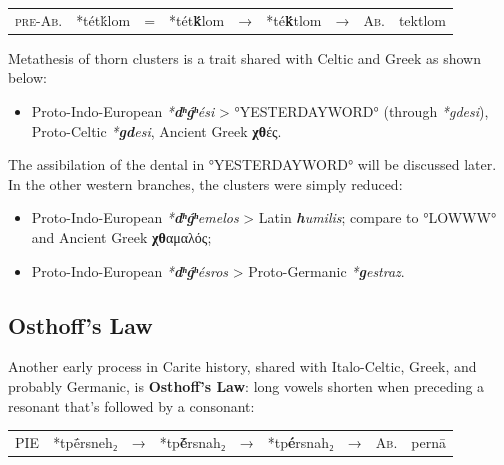 \documentclass[svgnames,x11names,b5paper]{book}
\begin{document}
            \begin{table}[H]
                \begin{center}
                \begin{tabular}{llcllllll}
                \textsc{pre-Ab.} & *tétḱlom & = & *tét\textbf{ḱ}lom & → & *té\textbf{ḱ}tlom & → & \textsc{Ab.} & tektlom\\
                \end{tabular}
                \end{center}
                \end{table}
        
            Metathesis of thorn clusters is a trait shared with Celtic and Greek as shown below:
\begin{itemize}
\item  Proto-Indo-European \textit{*\textbf{dʰǵʰ}ési} > °YESTERDAYWORD° (through \textit{*gdesi}), Proto-Celtic \textit{*\textbf{gd}esi}, Ancient Greek \textbf{χθ}ές.\\
\end{itemize}
The assibilation of the dental in °YESTERDAYWORD° will be discussed later. In the other western branches, the clusters were simply reduced:
\begin{itemize}
\item  Proto-Indo-European \textit{*\textbf{dʰǵʰ}emelos} > Latin \textit{\textbf{h}umilis}; compare to °LOWWW° and Ancient Greek \textbf{χθ}αμαλός;\\
\item  Proto-Indo-European \textit{*\textbf{dʰǵʰ}ésros} > Proto-Germanic \textit{*\textbf{g}estraz}.\\
\end{itemize}

            \subsection{Osthoff's Law}
        
        Another early process in Carite history, shared with Italo-Celtic, Greek, and probably Germanic, is \textbf{Osthoff's Law}: long vowels shorten when preceding a resonant that's followed by a consonant:

            \begin{table}[H]
                \begin{center}
                \begin{tabular}{llcllllll}
                \textsc{PIE} & *tpḗrsneh₂ & → & *tp\textbf{ḗ}rsnah₂ & → & *tp\textbf{é}rsnah₂ & → & \textsc{Ab.} & pernā\\
                \end{tabular}
                \end{center}
                \end{table}
        
\end{document}

